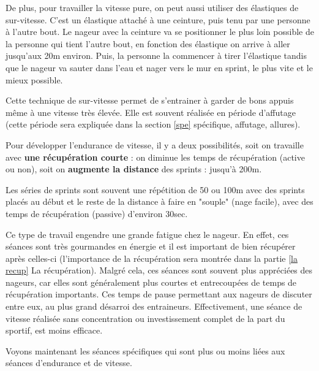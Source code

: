 \vspace{12pt}

De plus, pour travailler la vitesse pure, on peut aussi utiliser des élastiques de sur-vitesse. C'est un élastique attaché à une ceinture, puis tenu par une personne à l'autre bout. Le nageur avec la ceinture va se positionner le plus loin possible de la personne qui tient l'autre bout, en fonction des élastique on arrive à aller jusqu'aux 20m environ. Puis, la personne la commencer à tirer l'élastique tandis que le nageur va sauter dans l'eau et nager vers le mur en sprint, le plus vite et le mieux possible.

Cette technique de sur-vitesse permet de s'entrainer à garder de bons appuis même à une vitesse très élevée. Elle est souvent réalisée en période d'affutage (cette période sera expliquée dans la section \ref{spe} spécifique, affutage, allures).

\vspace{12pt}

Pour développer l'endurance de vitesse, il y a deux possibilités, soit on travaille avec \textbf{une récupération courte} : on diminue les temps de récupération (active ou non), soit on \textbf{augmente la distance} des sprints : jusqu'à 200m.

\vspace{12pt}

Les séries de sprints sont souvent une répétition de 50 ou 100m avec des sprints placés au début et le reste de la distance à faire en "souple" (nage facile), avec des temps de récupération (passive) d'environ 30sec.

\vspace{12pt}

Ce type de travail engendre une grande fatigue chez le nageur. En effet, ces séances sont très gourmandes en énergie et il est important de bien récupérer après celles-ci (l'importance de la récupération sera montrée dans la partie \ref{la recup} La récupération).
Malgré cela, ces séances sont souvent plus appréciées des nageurs, car elles sont généralement plus courtes et entrecoupées de temps de récupération importants. Ces temps de pause permettant aux nageurs de discuter entre eux, au plus grand désarroi des entraineurs. Effectivement, une séance de vitesse réalisée sans concentration ou investissement complet de la part du sportif, est moins efficace.

Voyons maintenant les séances spécifiques qui sont plus ou moins liées aux séances d'endurance et de vitesse.


